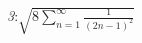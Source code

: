 \documentclass{standalone}
\begin{document}
{\emph3:}$\sqrt{8\sum_{n=1}^{\infty}\frac{1}{(2n-1)^2}}$
\end{document}
